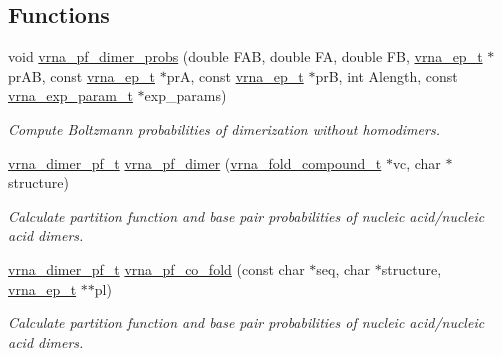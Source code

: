 \subsection*{Functions}
\begin{DoxyCompactItemize}
\item 
void \mbox{\hyperlink{group__pf__cofold_gaa1e39e73afb51fbaf4ae38f0c066c46b}{vrna\+\_\+pf\+\_\+dimer\+\_\+probs}} (double F\+AB, double FA, double FB, \mbox{\hyperlink{group__struct__utils_gab9ac98ab55ded9fb90043b024b915aca}{vrna\+\_\+ep\+\_\+t}} $\ast$pr\+AB, const \mbox{\hyperlink{group__struct__utils_gab9ac98ab55ded9fb90043b024b915aca}{vrna\+\_\+ep\+\_\+t}} $\ast$prA, const \mbox{\hyperlink{group__struct__utils_gab9ac98ab55ded9fb90043b024b915aca}{vrna\+\_\+ep\+\_\+t}} $\ast$prB, int Alength, const \mbox{\hyperlink{group__energy__parameters_ga01d8b92fe734df8d79a6169482c7d8d8}{vrna\+\_\+exp\+\_\+param\+\_\+t}} $\ast$exp\+\_\+params)
\begin{DoxyCompactList}\small\item\em Compute Boltzmann probabilities of dimerization without homodimers. \end{DoxyCompactList}\item 
\mbox{\hyperlink{group__pf__cofold_ga444df1587c9a2ca15b8eb25188f629c3}{vrna\+\_\+dimer\+\_\+pf\+\_\+t}} \mbox{\hyperlink{group__pf__cofold_ga4e5c7d06c302a7c59fc0d64dc142ca63}{vrna\+\_\+pf\+\_\+dimer}} (\mbox{\hyperlink{group__fold__compound_ga1b0cef17fd40466cef5968eaeeff6166}{vrna\+\_\+fold\+\_\+compound\+\_\+t}} $\ast$vc, char $\ast$structure)
\begin{DoxyCompactList}\small\item\em Calculate partition function and base pair probabilities of nucleic acid/nucleic acid dimers. \end{DoxyCompactList}\item 
\mbox{\hyperlink{group__pf__cofold_ga444df1587c9a2ca15b8eb25188f629c3}{vrna\+\_\+dimer\+\_\+pf\+\_\+t}} \mbox{\hyperlink{group__pf__cofold_gaf2b846f7ac382686f35ff7b9202fdd5c}{vrna\+\_\+pf\+\_\+co\+\_\+fold}} (const char $\ast$seq, char $\ast$structure, \mbox{\hyperlink{group__struct__utils_gab9ac98ab55ded9fb90043b024b915aca}{vrna\+\_\+ep\+\_\+t}} $\ast$$\ast$pl)
\begin{DoxyCompactList}\small\item\em Calculate partition function and base pair probabilities of nucleic acid/nucleic acid dimers. \end{DoxyCompactList}\end{DoxyCompactItemize}

